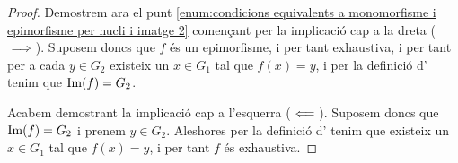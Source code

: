 \documentclass[../../Main.tex]{subfiles}
\begin{document}
\begin{proposition}
\begin{proof}
			Demostrem ara el punt \eqref{enum:condicions equivalents a monomorfisme i epimorfisme per nucli i imatge 2} començant per la implicació cap a la dreta (\(\implies\)). Suposem doncs que \(f\) és un epimorfisme, i per tant exhaustiva, i per tant per a cada \(y\in G_{2}\) existeix un \(x\in G_{1}\) tal que \(f(x)=y\), i per la definició d' tenim que \(\operatorname{Im}(f)=G_{2}\).
			
			Acabem demostrant la implicació cap a l'esquerra (\(\impliedby\)). Suposem doncs que \(\operatorname{Im}(f)=G_{2}\) i prenem \(y\in G_{2}\). Aleshores per la definició d' tenim que existeix un \(x\in G_{1}\) tal que \(f(x)=y\), i per tant \(f\) és exhaustiva. %
		\end{proof}
	\end{proposition}
\end{document}
